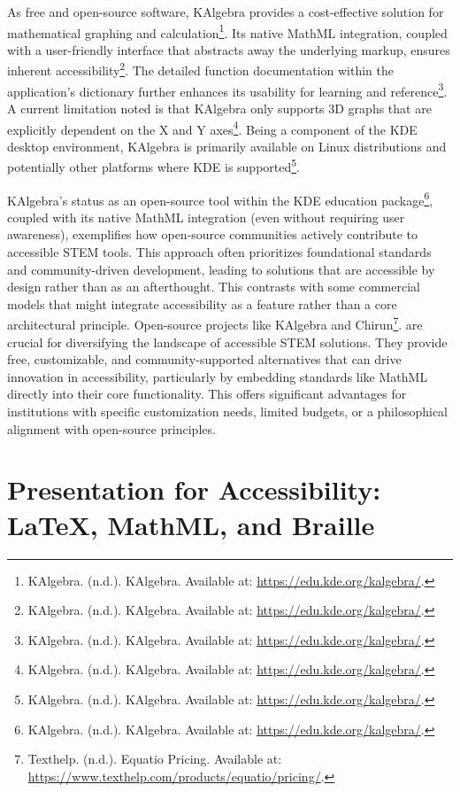 As free and open-source software, KAlgebra provides a cost-effective solution for mathematical graphing and calculation\footnote{KAlgebra. (n.d.). KAlgebra. Available at: \url{https://edu.kde.org/kalgebra/}.}. Its native MathML integration, coupled with a user-friendly interface that abstracts away the underlying markup, ensures inherent accessibility\footnote{KAlgebra. (n.d.). KAlgebra. Available at: \url{https://edu.kde.org/kalgebra/}.}. The detailed function documentation within the application's dictionary further enhances its usability for learning and reference\footnote{KAlgebra. (n.d.). KAlgebra. Available at: \url{https://edu.kde.org/kalgebra/}.}. A current limitation noted is that KAlgebra only supports 3D graphs that are explicitly dependent on the X and Y axes\footnote{KAlgebra. (n.d.). KAlgebra. Available at: \url{https://edu.kde.org/kalgebra/}.}. Being a component of the KDE desktop environment, KAlgebra is primarily available on Linux distributions and potentially other platforms where KDE is supported\footnote{KAlgebra. (n.d.). KAlgebra. Available at: \url{https://edu.kde.org/kalgebra/}.}.

KAlgebra's status as an open-source tool within the KDE education package\footnote{KAlgebra. (n.d.). KAlgebra. Available at: \url{https://edu.kde.org/kalgebra/}.}, coupled with its native MathML integration (even without requiring user awareness), exemplifies how open-source communities actively contribute to accessible STEM tools. This approach often prioritizes foundational standards and community-driven development, leading to solutions that are accessible by design rather than as an afterthought. This contrasts with some commercial models that might integrate accessibility as a feature rather than a core architectural principle. Open-source projects like KAlgebra and Chirun\footnote{Texthelp. (n.d.). Equatio Pricing. Available at: \url{https://www.texthelp.com/products/equatio/pricing/}.}. are crucial for diversifying the landscape of accessible STEM solutions. They provide free, customizable, and community-supported alternatives that can drive innovation in accessibility, particularly by embedding standards like MathML directly into their core functionality. This offers significant advantages for institutions with specific customization needs, limited budgets, or a philosophical alignment with open-source principles.

\section{Presentation for Accessibility: LaTeX, MathML, and Braille}
